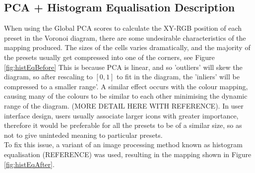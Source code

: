 \documentclass[11pt, oneside]{report}   	%
\begin{document}
\subsection{PCA + Histogram Equalisation Description}
When using the Global PCA scores to calculate the XY-RGB position of each preset in the Voronoi diagram, there are some undesirable characteristics of the mapping produced. The sizes of the cells varies dramatically, and the majority of the presets usually get compressed into one of the corners, see Figure \ref{fig:histEqBefore} This is because PCA is linear, and so 'outliers' will skew the diagram, so after rescaling to $[0, 1]$ to fit in the diagram, the 'inliers' will be compressed to a smaller range'. A similar effect occurs with the colour mapping, causing many of the colours to be similar to each other minimising the dynamic range of the diagram. (MORE DETAIL HERE WITH REFERENCE). In user interface design, users usually associate larger icons with greater importance, therefore it would be preferable for all the presets to be of a similar size, so as not to give uninteded meaning to particular presets.\\
To fix this issue, a variant of an image processing method known as histogram equalisation (REFERENCE) was used, resulting in the mapping shown in Figure \ref{fig:histEqAfter}.
\end{document}
